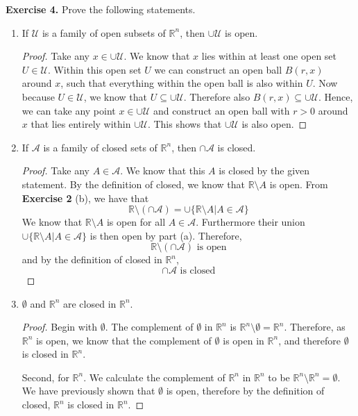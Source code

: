 \documentclass[11pt, leqno]{article}
\begin{document}
{\bfseries Exercise 4.} Prove the following statements.
\begin{enumerate}[label=(\alph*)]
	\item If $\mathcal{U}$ is a family of open subsets of $\mathbb{R}^n$, then $\cup \mathcal{U}$ is open.
	
	\begin{proof}
	Take any $x \in \cup \mathcal{U}$. We know that $x$ lies within at least one open set $U \in \mathcal{U}$. Within this open set $U$ we can construct an open ball $B(r,x)$ around $x$, such that everything within the open ball is also within $U$. Now because $U \in \mathcal{U}$, we know that $U \subseteq \cup \mathcal{U}$. Therefore also $B(r,x) \subseteq \cup \mathcal{U}$. Hence, we can take any point $x \in \cup \mathcal{U}$ and construct an open ball with $r > 0$ around $x$ that lies entirely within $\cup \mathcal{U}$. This shows that $\cup \mathcal{U}$ is also open.
	\end{proof}
	
	\item If $\mathcal{A}$ is a family of closed sets of $\mathbb{R}^n$, then $\cap \mathcal{A}$ is closed.
	
	\begin{proof}
	Take any $A \in \mathcal{A}$. We know that this $A$ is closed by the given statement. By the definition of closed, we know that $\mathbb{R} \setminus A$ is open. From {\bfseries Exercise 2} (b), we have that
	\[
		\mathbb{R} \setminus (\cap \mathcal{A}) = \cup \{\mathbb{R} \setminus A | A \in \mathcal{A}\}
	\]
	We know that $\mathbb{R} \setminus A$ is open for all $A \in \mathcal{A}$. Furthermore their union $\cup \{\mathbb{R} \setminus A | A \in \mathcal{A}\}$ is then open by part (a). Therefore,
	\[
		\mathbb{R} \setminus (\cap \mathcal{A}) \text{ is open}
	\]
	and by the definition of closed in $\mathbb{R}^n$,
	\[
		\cap \mathcal{A} \text{ is closed}
	\]
	\end{proof}
	
	\item $\emptyset$ and $\mathbb{R}^n$ are closed in $\mathbb{R}^n$.
	
	\begin{proof}
	Begin with $\emptyset$. The complement of $\emptyset$ in $\mathbb{R}^n$ is $\mathbb{R}^n \setminus \emptyset = \mathbb{R}^n$. Therefore, as $\mathbb{R}^n$ is open, we know that the complement of $\emptyset$ is open in $\mathbb{R}^n$, and therefore $\emptyset$ is closed in $\mathbb{R}^n$.
	
	Second, for $\mathbb{R}^n$. We calculate the complement of $\mathbb{R}^n$ in $\mathbb{R}^n$ to be $\mathbb{R}^n \setminus \mathbb{R}^n = \emptyset$. We have previously shown that $\emptyset$ is open, therefore by the definition of closed, $\mathbb{R}^n$ is closed in $\mathbb{R}^n$.
	\end{proof}

\end{enumerate}
\end{document}
